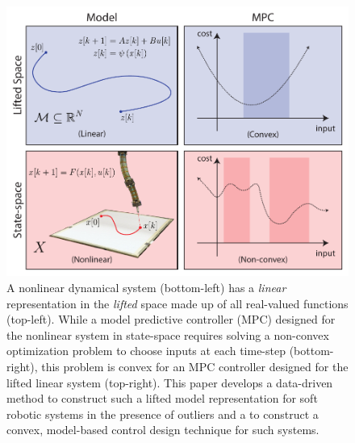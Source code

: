 \begin{figure}
    \centering
    \includegraphics[width=\linewidth]{figures/overview_v8.pdf}
    \caption{A nonlinear dynamical system (bottom-left) has a \emph{linear} representation in the \emph{lifted} space made up of all real-valued functions (top-left). While a model predictive controller (MPC) designed for the nonlinear system in state-space requires solving a non-convex optimization problem to choose inputs at each time-step (bottom-right), this problem is convex for an MPC controller designed for the lifted linear system (top-right). This paper develops a data-driven method to construct such a lifted model representation for soft robotic systems in the presence of outliers and a to construct a convex, model-based control design technique for such systems. }
    \label{fig:overview}
\end{figure}



